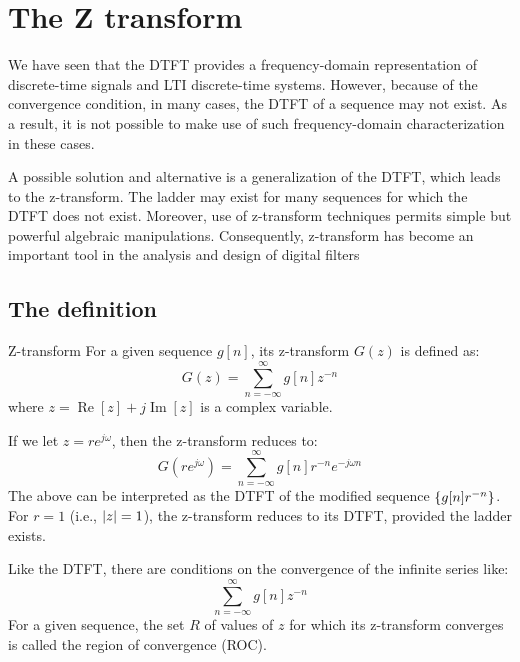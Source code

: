 \documentclass[../../main/main.tex]{subfiles}
\begin{document}
\chapter{The Z transform}


We have seen that the DTFT provides a frequency-domain representation of discrete-time signals and LTI discrete-time systems. However, because of the convergence condition, in many cases, the DTFT of a sequence may not exist. As a result, it is not possible to make use of such frequency-domain characterization in these cases.

A possible solution and alternative is a generalization of the DTFT, which leads to the z-transform. The ladder may exist for many sequences for which the DTFT does not exist. Moreover, use of z-transform techniques permits simple but powerful algebraic manipulations. Consequently, z-transform has become an important tool in the analysis and design of digital filters





\section{The definition}

\begin{definition}{Z-transform}{}
    For a given sequence \( g[n] \), its z-transform \( G(z) \) is defined as:
    \begin{equation}
        G(z)
        =
        \sum_{n=-\infty}^{\infty} g[n] z^{-n}
        \label{eq:L14_S05_1}
    \end{equation}
    where \( z = \operatorname{Re}[z] + j\operatorname{Im}[z] \) is a complex variable.
\end{definition}

If we let \( z = re^{j\omega} \), then the z-transform reduces to:
\begin{equation}
    G(re^{j\omega})
    =
    \sum_{n=-\infty}^{\infty} g[n] r^{-n} e^{-j\omega n}
    \label{eq:L14_S06_1}
\end{equation}
The above can be interpreted as the DTFT of the modified sequence \( \qty{g[n]r^{-n}} \). For \( r = 1 \) (i.e., \( \abs{z} = 1 \)), the z-transform reduces to its DTFT, provided the ladder exists.

Like the DTFT, there are conditions on the convergence of the infinite series like:
\begin{equation}
    \sum_{n=-\infty}^{\infty} g[n] z^{-n}
    \label{eq:L14_S07_1}
\end{equation}
For a given sequence, the set \( R \) of values of \( z \) for which its z-transform converges is called the region of convergence (ROC).
\end{document}
